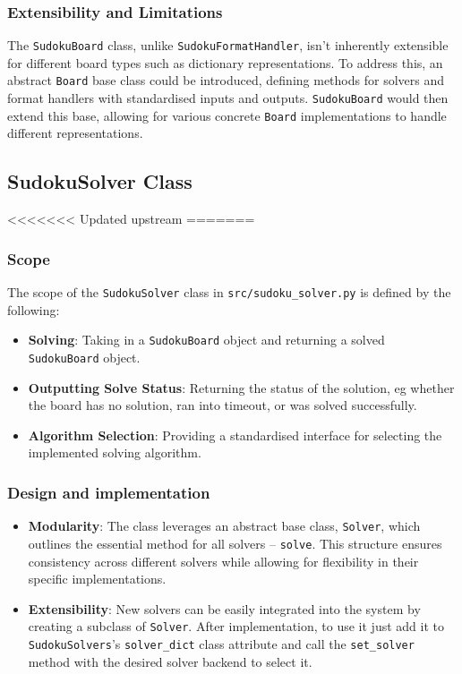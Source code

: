 \documentclass[11pt]{article}
\begin{document}
\begin{itemize}
\subsubsection{Extensibility and Limitations}
The \texttt{SudokuBoard} class, unlike \texttt{SudokuFormatHandler}, isn't inherently extensible for different board types such as dictionary representations. To address this, an abstract \texttt{Board} base class could be introduced, defining methods for solvers and format handlers with standardised inputs and outputs. \texttt{SudokuBoard} would then extend this base, allowing for various concrete \texttt{Board} implementations to handle different representations.
\subsection{SudokuSolver Class}
<<<<<<< Updated upstream
=======
\subsubsection{Scope}
The scope of the \texttt{SudokuSolver} class in \texttt{src/sudoku\_solver.py} is defined by the following:
\begin{itemize}
    \item \textbf{Solving}: Taking in a \texttt{SudokuBoard} object and returning a solved \texttt{SudokuBoard} object.
    \item \textbf{Outputting Solve Status}: Returning the status of the solution, eg whether the board has no solution, ran into timeout, or was solved successfully.
    \item \textbf{Algorithm Selection}: Providing a standardised interface for selecting the implemented solving algorithm.
\end{itemize}
\subsubsection{Design and implementation}
\begin{itemize}
    \item \textbf{Modularity}: The class leverages an abstract base class, \texttt{Solver}, which outlines the essential method for all solvers -- \texttt{solve}. This structure ensures consistency across different solvers while allowing for flexibility in their specific implementations.
    \item \textbf{Extensibility}: New solvers can be easily integrated into the system by creating a subclass of \texttt{Solver}. After implementation, to use it just add it to \texttt{SudokuSolvers}'s \texttt{solver\_dict} class attribute and call the \texttt{set\_solver} method with the desired solver backend to select it.
\end{itemize}


\end{itemize}
\end{document}
